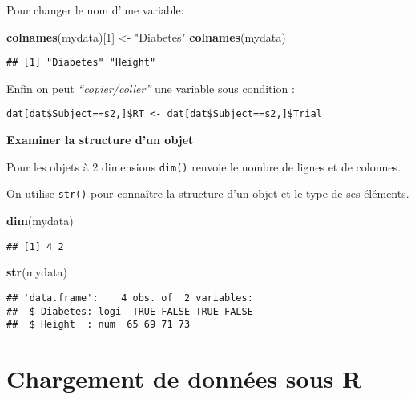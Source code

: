 \documentclass[]{book}
\newenvironment{Shaded}{\begin{snugshade}}{\end{snugshade}}
\newcommand{\DecValTok}[1]{\textcolor[rgb]{0.00,0.00,0.81}{#1}}
\newcommand{\KeywordTok}[1]{\textcolor[rgb]{0.13,0.29,0.53}{\textbf{#1}}}
\newcommand{\NormalTok}[1]{#1}
\newcommand{\StringTok}[1]{\textcolor[rgb]{0.31,0.60,0.02}{#1}}
\begin{document}
Pour changer le nom d'une variable:

\begin{Shaded}
\begin{Highlighting}[]
\KeywordTok{colnames}\NormalTok{(mydata)[}\DecValTok{1}\NormalTok{] <-}\StringTok{ "Diabetes"}
\KeywordTok{colnames}\NormalTok{(mydata)}
\end{Highlighting}
\end{Shaded}

\begin{verbatim}
## [1] "Diabetes" "Height"
\end{verbatim}

Enfin on peut \emph{``copier/coller''} une variable sous condition :

\texttt{dat{[}dat\$Subject==\textquotesingle{}s2\textquotesingle{},{]}\$RT\ \textless{}-\ dat{[}dat\$Subject==\textquotesingle{}s2\textquotesingle{},{]}\$Trial}

\textbf{Examiner la structure d'un objet}

Pour les objets à 2 dimensions \texttt{dim()} renvoie le nombre de lignes et de colonnes.

On utilise \texttt{str()} pour connaître la structure d'un objet et le type de ses éléments.

\begin{Shaded}
\begin{Highlighting}[]
\KeywordTok{dim}\NormalTok{(mydata)}
\end{Highlighting}
\end{Shaded}

\begin{verbatim}
## [1] 4 2
\end{verbatim}

\begin{Shaded}
\begin{Highlighting}[]
\KeywordTok{str}\NormalTok{(mydata)}
\end{Highlighting}
\end{Shaded}

\begin{verbatim}
## 'data.frame':    4 obs. of  2 variables:
##  $ Diabetes: logi  TRUE FALSE TRUE FALSE
##  $ Height  : num  65 69 71 73
\end{verbatim}

\hypertarget{chargement-de-donnees-sous-r}{%
\chapter{Chargement de données sous R}\label{chargement-de-donnees-sous-r}}
\end{document}
